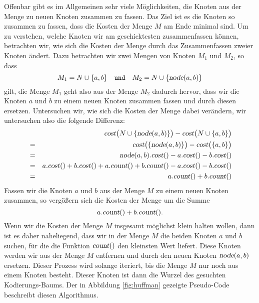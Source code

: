 Offenbar gibt es im Allgemeinen sehr viele M\"oglichkeiten, die Knoten aus der Menge zu
neuen Knoten zusammen zu fassen.  Das Ziel ist es die Knoten so zusammen zu fassen, dass
die Kosten der Menge $M$ am Ende  minimal sind.
Um zu verstehen, welche Knoten wir am geschicktesten zusammenfassen k\"onnen, betrachten wir, wie
sich die Kosten der Menge durch das Zusammenfassen zweier Knoten \"andert.
Dazu betrachten wir zwei Mengen von Knoten $M_1$ und $M_2$, so dass 
\[ M_1 = N \cup \{ a, b\} \quad \mathtt{und} \quad M_2 = N \cup \{ \textsl{node}(a,b) \} \]
gilt, die Menge $M_1$ geht also aus der Menge $M_2$ dadurch hervor, dass wir
die Knoten $a$ und $b$ zu einem neuen Knoten zusammen fassen und durch diesen ersetzen.
Untersuchen wir, wie
sich die Kosten der Menge dabei ver\"andern, wir untersuchen also die folgende Differenz:
\begin{eqnarray*}
& & \textsl{cost}\bigl(N \cup \{ \textsl{node}(a,b) \}\bigr) - \textsl{cost}\bigl(N \cup \{ a,b \}\bigr) \\
&=& \textsl{cost}\bigl( \{ \textsl{node}(a,b) \}\bigr) - \textsl{cost}\bigl(\{ a,b \}\bigr)              \\
&=& \textsl{node}(a,b).\textsl{cost}() - a.\textsl{cost}() - b.\textsl{cost}()                           \\
&=&   a.\textsl{cost}() + b.\textsl{cost}() + a.\textsl{count}() + b.\textsl{count}() 
    - a.\textsl{cost}() - b.\textsl{cost}()                                                              \\
&=& a.\textsl{count}() + b.\textsl{count}() 
\end{eqnarray*}
Fassen wir die Knoten $a$ und $b$ aus der Menge $M$ zu einem neuen Knoten zusammen, so verg\"o{\ss}ern sich
die Kosten der Menge um die Summe
\[ a.\textsl{count}() + b.\textsl{count}(). \]
Wenn wir die Kosten der Menge $M$ insgesamt m\"oglichst klein halten wollen, dann ist es daher naheliegend,
dass wir in der Menge $M$ die beiden Knoten $a$ und $b$ suchen, f\"ur die die Funktion
$\textsl{count}()$ den kleinsten Wert liefert.  Diese Knoten werden wir aus der Menge $M$
entfernen und durch den neuen Knoten $\textsl{node}(a,b)$ ersetzen.
Dieser Prozess wird solange iteriert, bis die Menge $M$ nur noch aus einem Knoten besteht.  Dieser
Knoten ist dann die Wurzel des gesuchten Kodierungs-Baums. 
Der in Abbildung \ref{fig:huffman} gezeigte Pseudo-Code beschreibt diesen Algorithmus.

